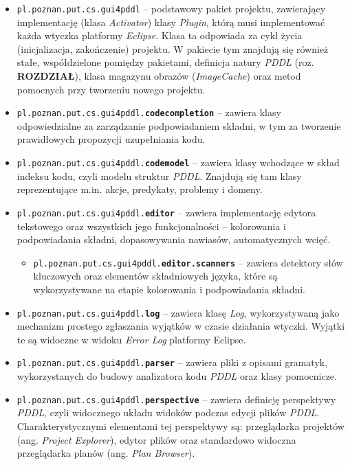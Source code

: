 \begin{itemize}
\item \texttt{pl.poznan.put.cs.gui4pddl} -- podstawowy pakiet projektu, zawierający implementację (klasa \textit{Activator}) klasy \textit{Plugin}, którą musi implementować każda wtyczka platformy \textit{Eclipse}. Klasa ta odpowiada za cykl życia (inicjalizacja, zakończenie) projektu. W pakiecie tym znajdują się również stałe, współdzielone pomiędzy pakietami, definicja natury \textit{PDDL} (roz. \textbf{ROZDZIAŁ}), klasa magazynu obrazów (\textit{ImageCache}) oraz metod pomocnych przy tworzeniu nowego projektu.
\item \texttt{pl.poznan.put.cs.gui4pddl.\textbf{codecompletion}} -- zawiera klasy odpowiedzialne za zarządzanie podpowiadaniem składni, w tym za tworzenie prawidłowych propozycji uzupełniania kodu.
\item \texttt{pl.poznan.put.cs.gui4pddl.\textbf{codemodel}} -- zawiera klasy wchodzące w skład indeksu kodu, czyli modelu struktur \textit{PDDL}. Znajdują się tam klasy reprezentujące m.in. akcje, predykaty, problemy i domeny.
\item \texttt{pl.poznan.put.cs.gui4pddl.\textbf{editor}} -- zawiera implementację edytora tekstowego oraz wszystkich jego funkcjonalności -- kolorowania i podpowiadania składni, dopasowywania nawiasów, automatycznych wcięć.
\begin{itemize}
\item \texttt{pl.poznan.put.cs.gui4pddl.\textbf{editor.scanners}} -- zawiera detektory słów kluczowych oraz elementów składniowych języka, które są wykorzystywane na etapie kolorowania i podpowiadania składni.
\end{itemize}
\item \texttt{pl.poznan.put.cs.gui4pddl.\textbf{log}} -- zawiera klasę \textit{Log}, wykorzystywaną jako mechanizm prostego zgłaszania wyjątków w czasie działania wtyczki. Wyjątki te są widoczne w widoku \textit{Error Log} platformy Eclipse.
\item \texttt{pl.poznan.put.cs.gui4pddl.\textbf{parser}} -- zawiera pliki z opisami gramatyk, wykorzystanych do budowy analizatora kodu \textit{PDDL} oraz klasy pomocnicze.
\item \texttt{pl.poznan.put.cs.gui4pddl.\textbf{perspective}} -- zawiera definicję perspektywy \textit{PDDL}, czyli widocznego układu widoków podczas edycji plików \textit{PDDL}. Charakterystycznymi elementami tej perspektywy są: przeglądarka projektów (ang. \textit{Project Explorer}), edytor plików oraz standardowo widoczna przeglądarka planów (ang. \textit{Plan Browser}).

\end{itemize}
